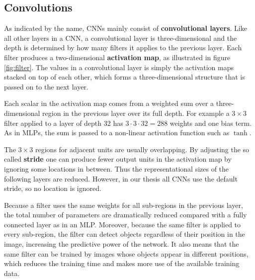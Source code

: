 
\subsection{Convolutions}



As indicated by the name, CNNs mainly consist of \textbf{convolutional layers}. Like all other layers in a CNN, a convolutional layer is three-dimensional and the depth is determined by how many filters it applies to the previous layer.  Each filter produces a two-dimensional \textbf{activation map}, as illustrated in figure \ref{fig:filter}. The values in a convolutional layer is simply the activation maps stacked on top of each other, which forms a three-dimensional structure that is passed on to the next layer.

Each scalar in the activation map comes from a weighted sum over a three-dimensional region in the previous layer over its full depth. For example a $3 \times 3$ filter applied to a layer of depth 32 has $3 \cdot 3 \cdot 32=288$ weights and one bias term.
As in MLPs, the sum is passed to a non-linear activation function such as $\tanh$.

The $3 \times 3$ regions for adjacent units are usually overlapping.
By adjusting the so called \textbf{stride} one can produce fewer output units in the activation map by ignoring some locations in between.
Thus the representational sizes of the following layers are reduced.
However, in our thesis all CNNs use the default stride, so no location is ignored.


Because a filter uses the same weights for all sub-regions in the previous layer, the total number of parameters are dramatically reduced compared with a fully connected layer as in an MLP. Moreover, because the same filter is applied to every sub-region, the filter can detect objects regardless of their position in the image, increasing the predictive power of the network.
It also means that the same filter can be trained by images whose objects appear in different positions, which reduces the training time and makes more use of the available training data.

